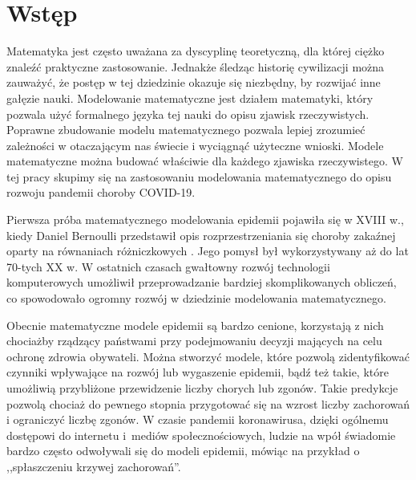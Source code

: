 \documentclass[12pt]{mwbk}
\theoremstyle{plain}
\theoremstyle{definition}
\theoremstyle{definition}
\begin{document}



\tableofcontents


\chapter*{Wstęp}


Matematyka jest często uważana za dyscyplinę teoretyczną, dla której ciężko znaleźć praktyczne zastosowanie. Jednakże śledząc historię cywilizacji można zauważyć, że postęp w tej dziedzinie okazuje się niezbędny, by rozwijać inne gałęzie nauki. Modelowanie matematyczne jest działem matematyki, który pozwala użyć formalnego języka tej nauki do opisu zjawisk rzeczywistych. Poprawne zbudowanie modelu matematycznego pozwala lepiej zrozumieć zależności w otaczającym nas świecie i wyciągnąć użyteczne wnioski. Modele matematyczne można budować właściwie dla każdego zjawiska rzeczywistego. W tej pracy skupimy się na zastosowaniu modelowania matematycznego do opisu rozwoju pandemii choroby COVID-19.

Pierwsza próba matematycznego modelowania epidemii pojawiła się w XVIII w., kiedy Daniel Bernoulli przedstawił opis rozprzestrzeniania się choroby zakaźnej oparty na równaniach różniczkowych \cite{epidemie}. Jego pomysł był wykorzystywany aż do lat 70-tych XX w. W ostatnich czasach gwałtowny rozwój technologii komputerowych umożliwił przeprowadzanie bardziej skomplikowanych obliczeń, co spowodowało ogromny rozwój w dziedzinie modelowania matematycznego. 

Obecnie matematyczne modele epidemii są bardzo cenione, korzystają z nich chociażby rządzący państwami przy podejmowaniu decyzji mających na celu ochronę zdrowia obywateli. Można stworzyć modele, które pozwolą zidentyfikować czynniki wpływające na rozwój lub wygaszenie epidemii, bądź też takie, które umożliwią przybliżone przewidzenie liczby chorych lub zgonów. Takie predykcje pozwolą chociaż do pewnego stopnia przygotować się na wzrost liczby zachorowań i ograniczyć liczbę zgonów. W czasie pandemii koronawirusa, dzięki ogólnemu dostępowi do internetu i~mediów społecznościowych, ludzie na wpół świadomie bardzo często odwoływali się do modeli epidemii, mówiąc na przykład o ,,spłaszczeniu krzywej zachorowań''.
\end{document}

